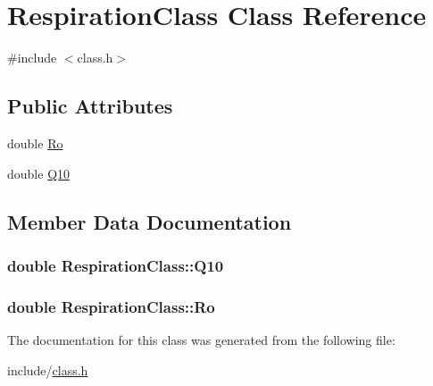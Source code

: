 \hypertarget{class_respiration_class}{}\section{Respiration\+Class Class Reference}
\label{class_respiration_class}


{\ttfamily \#include $<$class.\+h$>$}

\subsection*{Public Attributes}
\begin{DoxyCompactItemize}
\item 
double \hyperlink{class_respiration_class_a01fb511b9a6a266c6ae86105e735a380}{Ro}
\item 
double \hyperlink{class_respiration_class_a9390a608710ea8f588899e1703363696}{Q10}
\end{DoxyCompactItemize}


\subsection{Member Data Documentation}
\subsubsection[{\texorpdfstring{Q10}{Q10}}]{\setlength{\rightskip}{0pt plus 5cm}double Respiration\+Class\+::\+Q10}\hypertarget{class_respiration_class_a9390a608710ea8f588899e1703363696}{}\label{class_respiration_class_a9390a608710ea8f588899e1703363696}
\subsubsection[{\texorpdfstring{Ro}{Ro}}]{\setlength{\rightskip}{0pt plus 5cm}double Respiration\+Class\+::\+Ro}\hypertarget{class_respiration_class_a01fb511b9a6a266c6ae86105e735a380}{}\label{class_respiration_class_a01fb511b9a6a266c6ae86105e735a380}


The documentation for this class was generated from the following file\+:\begin{DoxyCompactItemize}
\item 
include/\hyperlink{class_8h}{class.\+h}\end{DoxyCompactItemize}
